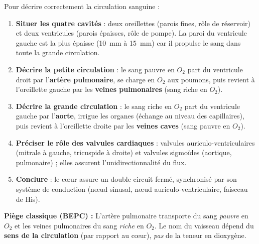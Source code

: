\documentclass[11pt]{article}
\newcommand{\cle}[1]{{\popxbold\color{popdark}#1}}
\begin{document}
\begin{methode}
Pour décrire correctement la circulation sanguine :
\begin{enumerate}
\item \textbf{Situer les quatre cavités} : deux oreillettes (parois fines, rôle de réservoir) et deux ventricules (parois épaisses, rôle de pompe). La paroi du \cle{ventricule gauche} est la plus épaisse (\SI{10}{mm} à \SI{15}{mm}) car il propulse le sang dans toute la grande circulation.
\item \textbf{Décrire la petite circulation} : le sang pauvre en $O_2$ part du ventricule droit par l'\textbf{artère pulmonaire}, se charge en $O_2$ aux poumons, puis revient à l'oreillette gauche par les \textbf{veines pulmonaires} (sang riche en $O_2$).
\item \textbf{Décrire la grande circulation} : le sang riche en $O_2$ part du ventricule gauche par l'\textbf{aorte}, irrigue les organes (échange au niveau des capillaires), puis revient à l'oreillette droite par les \textbf{veines caves} (sang pauvre en $O_2$).
\item \textbf{Préciser le rôle des valvules cardiaques} : valvules auriculo-ventriculaires (mitrale à gauche, tricuspide à droite) et valvules sigmoïdes (aortique, pulmonaire) ; elles assurent l'unidirectionnalité du flux.
\item \textbf{Conclure} : le cœur assure un double circuit fermé, synchronisé par son système de conduction (nœud sinusal, nœud auriculo-ventriculaire, faisceau de His).
\end{enumerate}
\textbf{Piège classique (BEPC) :} L'artère pulmonaire transporte du sang \emph{pauvre} en $O_2$ et les veines pulmonaires du sang \emph{riche} en $O_2$. Le nom du vaisseau dépend du \textbf{sens de la circulation} (par rapport au cœur), \emph{pas} de la teneur en dioxygène.
\end{methode}
\end{document}
